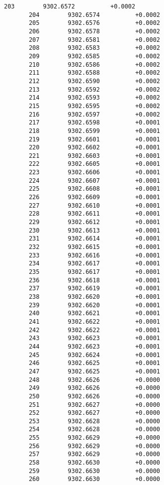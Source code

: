 \documentclass[11pt]{article}
\begin{document}
\begin{Verbatim}[commandchars=\\\{\}]
       203        9302.6572          +0.0002
       204        9302.6574          +0.0002
       205        9302.6576          +0.0002
       206        9302.6578          +0.0002
       207        9302.6581          +0.0002
       208        9302.6583          +0.0002
       209        9302.6585          +0.0002
       210        9302.6586          +0.0002
       211        9302.6588          +0.0002
       212        9302.6590          +0.0002
       213        9302.6592          +0.0002
       214        9302.6593          +0.0002
       215        9302.6595          +0.0002
       216        9302.6597          +0.0002
       217        9302.6598          +0.0001
       218        9302.6599          +0.0001
       219        9302.6601          +0.0001
       220        9302.6602          +0.0001
       221        9302.6603          +0.0001
       222        9302.6605          +0.0001
       223        9302.6606          +0.0001
       224        9302.6607          +0.0001
       225        9302.6608          +0.0001
       226        9302.6609          +0.0001
       227        9302.6610          +0.0001
       228        9302.6611          +0.0001
       229        9302.6612          +0.0001
       230        9302.6613          +0.0001
       231        9302.6614          +0.0001
       232        9302.6615          +0.0001
       233        9302.6616          +0.0001
       234        9302.6617          +0.0001
       235        9302.6617          +0.0001
       236        9302.6618          +0.0001
       237        9302.6619          +0.0001
       238        9302.6620          +0.0001
       239        9302.6620          +0.0001
       240        9302.6621          +0.0001
       241        9302.6622          +0.0001
       242        9302.6622          +0.0001
       243        9302.6623          +0.0001
       244        9302.6623          +0.0001
       245        9302.6624          +0.0001
       246        9302.6625          +0.0001
       247        9302.6625          +0.0001
       248        9302.6626          +0.0000
       249        9302.6626          +0.0000
       250        9302.6626          +0.0000
       251        9302.6627          +0.0000
       252        9302.6627          +0.0000
       253        9302.6628          +0.0000
       254        9302.6628          +0.0000
       255        9302.6629          +0.0000
       256        9302.6629          +0.0000
       257        9302.6629          +0.0000
       258        9302.6630          +0.0000
       259        9302.6630          +0.0000
       260        9302.6630          +0.0000

\end{Verbatim}
\end{document}

